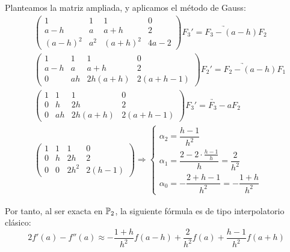 \begin{ejercicio}
\begin{enumerate}
        Planteamos la matriz ampliada, y aplicamos el método de Gauss:
        \begin{align*}
            &\left(\begin{array}{ccc|c}
                1 & 1 & 1 & 0 \\
                a-h & a & a+h & 2 \\
                (a-h)^2 & a^2 & (a+h)^2 & 4a-2
            \end{array}\right) \underrightarrow{F_3'=F_3-(a-h)F_2}
            \\&\left(\begin{array}{ccc|c}
                1 & 1 & 1 & 0 \\
                a-h & a & a+h & 2 \\
                0 & ah & 2h(a+h) & 2(a+h-1)
            \end{array}\right)\underrightarrow{F_2'=F_2-(a-h)F_1}
            \\&\left(\begin{array}{ccc|c}
                1 & 1 & 1 & 0 \\
                0 & h & 2h & 2 \\
                0 & ah & 2h(a+h) & 2(a+h-1)
            \end{array}\right)\underrightarrow{F_3'=F_3-aF_2}
            \\&\left(\begin{array}{ccc|c}
                1 & 1 & 1 & 0 \\
                0 & h & 2h & 2 \\
                0 & 0 & 2h^2 & 2(h-1)
            \end{array}\right)
            \Longrightarrow
            \begin{cases}
                \alpha_2 = \dfrac{h-1}{h^2} \\
                \alpha_1 = \dfrac{2-2\cdot \frac{h-1}{h}}{h} = \dfrac{2}{h^2}\\
                \alpha_0 = -\dfrac{2+h-1}{h^2} = -\dfrac{1+h}{h^2}
            \end{cases}
        \end{align*}

        Por tanto, al ser exacta en $\mathbb{P}_2$, la siguiente fórmula es de tipo interpolatorio clásico:
        \begin{equation*}
            2f'(a) - f''(a) \approx -\dfrac{1+h}{h^2}f(a-h) + \dfrac{2}{h^2}f(a) + \dfrac{h-1}{h^2}f(a+h)
        \end{equation*}
        

\end{enumerate}
\end{ejercicio}
